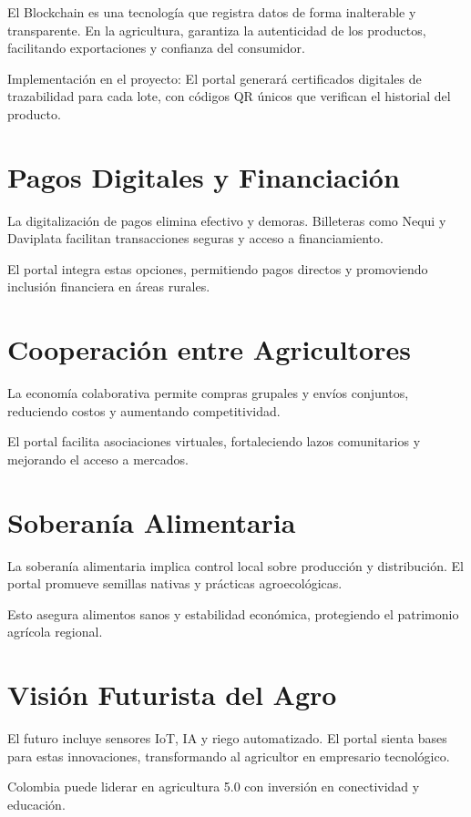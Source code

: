 El Blockchain es una tecnología que registra datos de forma inalterable y transparente. En la agricultura, garantiza la autenticidad de los productos, facilitando exportaciones y confianza del consumidor.

Implementación en el proyecto: El portal generará certificados digitales de trazabilidad para cada lote, con códigos QR únicos que verifican el historial del producto.

\section{Pagos Digitales y Financiación}

La digitalización de pagos elimina efectivo y demoras. Billeteras como Nequi y Daviplata facilitan transacciones seguras y acceso a financiamiento.

El portal integra estas opciones, permitiendo pagos directos y promoviendo inclusión financiera en áreas rurales.

\section{Cooperación entre Agricultores}

La economía colaborativa permite compras grupales y envíos conjuntos, reduciendo costos y aumentando competitividad.

El portal facilita asociaciones virtuales, fortaleciendo lazos comunitarios y mejorando el acceso a mercados.

\section{Soberanía Alimentaria}

La soberanía alimentaria implica control local sobre producción y distribución. El portal promueve semillas nativas y prácticas agroecológicas.

Esto asegura alimentos sanos y estabilidad económica, protegiendo el patrimonio agrícola regional.

\section{Visión Futurista del Agro}

El futuro incluye sensores IoT, IA y riego automatizado. El portal sienta bases para estas innovaciones, transformando al agricultor en empresario tecnológico.

Colombia puede liderar en agricultura 5.0 con inversión en conectividad y educación.

